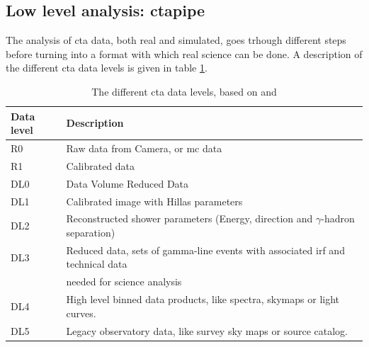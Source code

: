 \documentclass[main.tex]{subfiles}
\begin{document}
\subsection{Low level analysis: ctapipe}

The analysis of \gls{cta} data, both real and simulated, goes trhough different steps before turning into a format with which real science can be done. A description of the different \gls{cta} data levels is given in table \ref{tab:CTAdatalevels}. 


\begin{table}
  \centering
  \begin{tabular}{|l|l|}
    \hline
    Data level & Description \\
    \hline
    R0 & Raw data from Camera, or \gls{mc} data\\
    R1 & Calibrated data \\
    DL0 & Data Volume Reduced Data \\
    DL1 & Calibrated image with Hillas parameters \\
    DL2 & Reconstructed shower parameters (Energy, direction and $\gamma$-hadron separation) \\
    DL3 & Reduced data, sets of gamma-line events with associated \gls{irf} and technical data\\
    & needed for science analysis \\
    DL4 & High level binned data products, like spectra, skymaps or light curves.\\
    DL5 & Legacy observatory data, like survey sky maps or source catalog. \\
    \hline
  \end{tabular}
  \caption{The different \gls{cta} data levels, based on \cite{ctapipe} and \cite{2015CTAdata}}
  \label{tab:CTAdatalevels}
\end{table}
\end{document}
